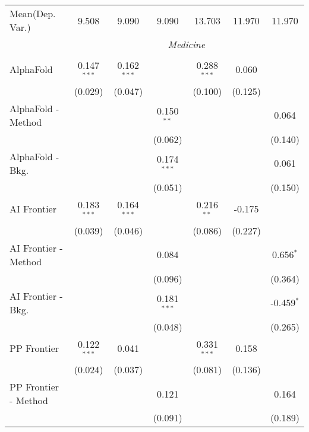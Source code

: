 \begin{tabular}{lcccccc}
Mean(Dep. Var.) & 9.508 & 9.090 & 9.090 & 13.703 & 11.970 & 11.970 \\
 & \multicolumn{6}{c}{\textit{Medicine}} \\ \\
   AlphaFold            & 0.147$^{***}$ & 0.162$^{***}$ &               & 0.288$^{***}$ & 0.060   &   \\   
                        & (0.029)       & (0.047)       &               & (0.100)       & (0.125) &   \\   
   AlphaFold - Method   &               &               & 0.150$^{**}$  &               &         & 0.064\\   
                        &               &               & (0.062)       &               &         & (0.140)\\   
   AlphaFold - Bkg.     &               &               & 0.174$^{***}$ &               &         & 0.061\\   
                        &               &               & (0.051)       &               &         & (0.150)\\   
   AI Frontier          & 0.183$^{***}$ & 0.164$^{***}$ &               & 0.216$^{**}$  & -0.175  &   \\   
                        & (0.039)       & (0.046)       &               & (0.086)       & (0.227) &   \\   
   AI Frontier - Method &               &               & 0.084         &               &         & 0.656$^{*}$\\   
                        &               &               & (0.096)       &               &         & (0.364)\\   
   AI Frontier - Bkg.   &               &               & 0.181$^{***}$ &               &         & -0.459$^{*}$\\   
                        &               &               & (0.048)       &               &         & (0.265)\\   
   PP Frontier          & 0.122$^{***}$ & 0.041         &               & 0.331$^{***}$ & 0.158   &   \\   
                        & (0.024)       & (0.037)       &               & (0.081)       & (0.136) &   \\   
   PP Frontier - Method &               &               & 0.121         &               &         & 0.164\\   
                        &               &               & (0.091)       &               &         & (0.189)\\   

\end{tabular}
